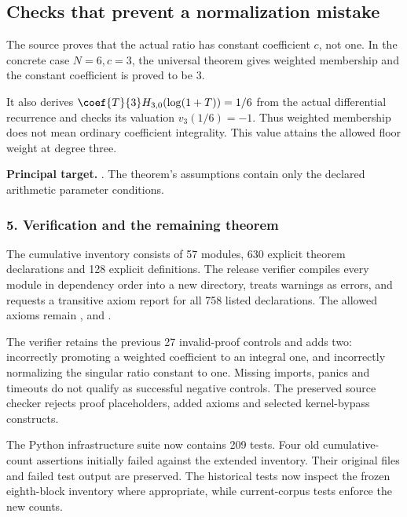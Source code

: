\subsection*{Checks that prevent a normalization mistake}
The source proves that the actual ratio has constant coefficient $c$, not one. In the concrete case $N=6,c=3$, the universal theorem gives weighted membership and the constant coefficient is proved to be $3$.

It also derives $\coef{T}{3}H_{3,0}(\log(1+T))=1/6$ from the actual differential recurrence and checks its valuation $v_3(1/6)=-1$. Thus weighted membership does not mean ordinary coefficient integrality. This value attains the allowed floor weight at degree three.

\textbf{Principal target.} . The theorem's assumptions contain only the declared arithmetic parameter conditions.
\par\medskip
\subsubsection*{5. Verification and the remaining theorem}
The cumulative inventory consists of 57 modules, 630 explicit theorem declarations and 128 explicit definitions. The release verifier compiles every module in dependency order into a new directory, treats warnings as errors, and requests a transitive axiom report for all 758 listed declarations. The allowed axioms remain ,  and .

The verifier retains the previous 27 invalid-proof controls and adds two: incorrectly promoting a weighted coefficient to an integral one, and incorrectly normalizing the singular ratio constant to one. Missing imports, panics and timeouts do not qualify as successful negative controls. The preserved source checker rejects proof placeholders, added axioms and selected kernel-bypass constructs.

The Python infrastructure suite now contains 209 tests. Four old cumulative-count assertions initially failed against the extended inventory. Their original files and failed test output are preserved. The historical tests now inspect the frozen eighth-block inventory where appropriate, while current-corpus tests enforce the new counts.

